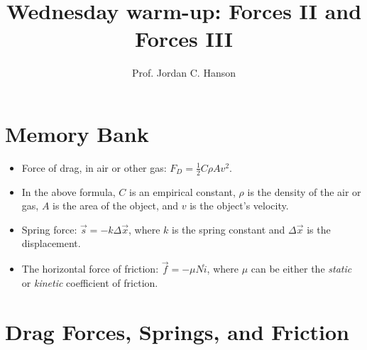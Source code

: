 \documentclass{article}
\begin{document}
\twocolumn

\title{Wednesday warm-up: Forces II and Forces III}
\author{Prof. Jordan C. Hanson}

\maketitle

\section{Memory Bank}

\begin{itemize}
\item Force of drag, in air or other gas: $F_D = \frac{1}{2}C \rho A v^2$.
\item In the above formula, $C$ is an empirical constant, $\rho$ is the density of the air or gas, $A$ is the area of the object, and $v$ is the object's velocity.
\item Spring force: $\vec{s} = -k \Delta \vec{x}$, where $k$ is the spring constant and $\Delta\vec{x}$ is the displacement.
\item The horizontal force of friction: $\vec{f} = -\mu N \hat{i}$, where $\mu$ can be either the \textit{static} or \textit{kinetic} coefficient of friction.
\end{itemize}

\section{Drag Forces, Springs, and Friction}
\end{document}
